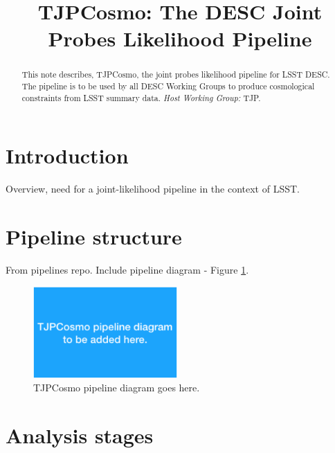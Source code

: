 \documentclass[\docopts]{\docclass}
\begin{document}
\title{TJPCosmo: The DESC Joint Probes Likelihood Pipeline}

\maketitlepre

\begin{abstract}

  This note describes, TJPCosmo, the joint probes likelihood pipeline for LSST DESC. The pipeline is to be used by all DESC Working Groups to produce cosmological constraints from LSST summary data. {\it Host Working Group:} TJP.

\end{abstract}

\dockeys{}

\maketitlepost


\section{Introduction}
\label{sec:intro}

Overview, need for a joint-likelihood pipeline in the context of LSST.


\section{Pipeline structure}
\label{sec:struct}

From pipelines repo. Include pipeline diagram - Figure \ref{fig:diagram}.

\begin{figure}
  \centering
  \includegraphics[width=0.49\textwidth]{tjpcosmo_diagram.eps}
  \caption{TJPCosmo pipeline diagram goes here.}
  \label{fig:diagram}
\end{figure}


\section{Analysis stages}
\label{sec:analysis}
\end{document}
